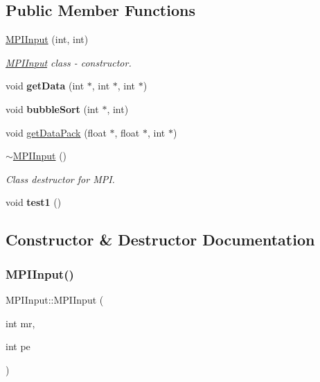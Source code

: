 \subsection*{Public Member Functions}
\begin{DoxyCompactItemize}
\item 
\hyperlink{classMPIInput_aad9097968754daede74b4e9931f58c8a}{M\+P\+I\+Input} (int, int)
\begin{DoxyCompactList}\small\item\em \hyperlink{classMPIInput}{M\+P\+I\+Input} class -\/ constructor. \end{DoxyCompactList}\item 
\mbox{\label{classMPIInput_aa8315f5114ca593abf06353b92edc76c}} 
void {\bfseries get\+Data} (int $\ast$, int $\ast$, int $\ast$)
\item 
\mbox{\label{classMPIInput_a392cacb93d5455f14070430f1b8374dd}} 
void {\bfseries bubble\+Sort} (int $\ast$, int)
\item 
void \hyperlink{classMPIInput_a2f62ee6db67ef581bc7331512a50f2c1}{get\+Data\+Pack} (float $\ast$, float $\ast$, int $\ast$)
\item 
\hyperlink{classMPIInput_ac29d1da098f24e53d405551b056a1893}{$\sim$\+M\+P\+I\+Input} ()
\begin{DoxyCompactList}\small\item\em Class destructor for M\+PI. \end{DoxyCompactList}\item 
\mbox{\label{classMPIInput_a3079c90079e6add299d05206b39231cb}} 
void {\bfseries test1} ()
\end{DoxyCompactItemize}


\subsection{Constructor \& Destructor Documentation}
\mbox{\label{classMPIInput_aad9097968754daede74b4e9931f58c8a}} 
\subsubsection{\texorpdfstring{M\+P\+I\+Input()}{MPIInput()}}
{\footnotesize\ttfamily M\+P\+I\+Input\+::\+M\+P\+I\+Input (\begin{DoxyParamCaption}\item[{int}]{mr,  }\item[{int}]{pe }\end{DoxyParamCaption})}




